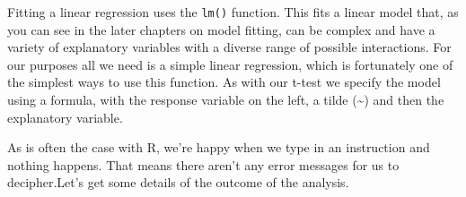 \documentclass[
]{book}
\newenvironment{Shaded}{\begin{snugshade}}{\end{snugshade}}
\newcommand{\KeywordTok}[1]{\textcolor[rgb]{0.13,0.29,0.53}{\textbf{#1}}}
\newcommand{\NormalTok}[1]{#1}
\newcommand{\OperatorTok}[1]{\textcolor[rgb]{0.81,0.36,0.00}{\textbf{#1}}}
\begin{document}
Fitting a linear regression uses the \texttt{lm()} function. This fits a linear model that, as you can see in the later chapters on model fitting, can be complex and have a variety of explanatory variables with a diverse range of possible interactions. For our purposes all we need is a simple linear regression, which is fortunately one of the simplest ways to use this function. As with our t-test we specify the model using a formula, with the response variable on the left, a tilde (\textasciitilde) and then the explanatory variable.

\begin{Shaded}
\end{Shaded}

As is often the case with R, we're happy when we type in an instruction and nothing happens. That means there aren't any error messages for us to decipher.Let's get some details of the outcome of the analysis.
\end{document}
